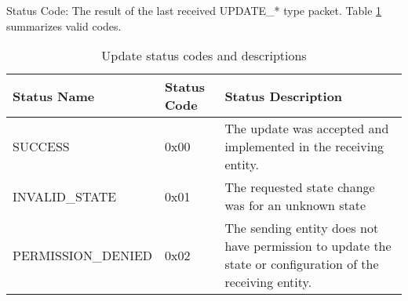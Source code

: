 \documentclass[11pt]{article}
\begin{document}
Status Code: The result of the last received UPDATE\_* type packet.
Table \ref{tab:updateStatusCodes} summarizes valid codes.

\begin{table}[h!]
    \centering
    \caption{Update status codes and descriptions}
    \label{tab:updateStatusCodes}
    \begin{tabular}{|p{2in}|p{.8in}|p{3.25in}|}
        \hline
        Status Name & Status Code & Status Description \\
        \hline
        SUCCESS & 0x00 & The update was accepted and implemented in the receiving entity. \\
        \hline
        INVALID\_STATE & 0x01 & The requested state change was for an unknown state \\
        \hline
        PERMISSION\_DENIED & 0x02 & The sending entity does not have permission to update 
        the state or configuration of the receiving entity. \\
        \hline
    \end{tabular}
\end{table}
\end{document}
